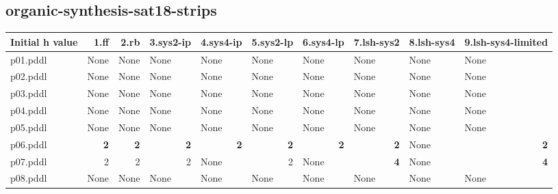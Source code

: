 \documentclass{article}
\begin{document}
\hypertarget{initial_h_value-organic-synthesis-sat18-strips}{}
\subsection*{organic-synthesis-sat18-strips}

\begin{tabular}{@{}lrrrrrrrrr@{}}
Initial h value & 1.ff & 2.rb & 3.sys2-ip & 4.sys4-ip & 5.sys2-lp & 6.sys4-lp & 7.lsh-sys2 & 8.lsh-sys4 & 9.lsh-sys4-limited \\
\midrule
p01.pddl & \multicolumn{1}{|l|}{None} & \multicolumn{1}{|l|}{None} & \multicolumn{1}{|l|}{None} & \multicolumn{1}{|l|}{None} & \multicolumn{1}{|l|}{None} & \multicolumn{1}{|l|}{None} & \multicolumn{1}{|l|}{None} & \multicolumn{1}{|l|}{None} & \multicolumn{1}{|l|}{None} \\
p02.pddl & \multicolumn{1}{|l|}{None} & \multicolumn{1}{|l|}{None} & \multicolumn{1}{|l|}{None} & \multicolumn{1}{|l|}{None} & \multicolumn{1}{|l|}{None} & \multicolumn{1}{|l|}{None} & \multicolumn{1}{|l|}{None} & \multicolumn{1}{|l|}{None} & \multicolumn{1}{|l|}{None} \\
p03.pddl & \multicolumn{1}{|l|}{None} & \multicolumn{1}{|l|}{None} & \multicolumn{1}{|l|}{None} & \multicolumn{1}{|l|}{None} & \multicolumn{1}{|l|}{None} & \multicolumn{1}{|l|}{None} & \multicolumn{1}{|l|}{None} & \multicolumn{1}{|l|}{None} & \multicolumn{1}{|l|}{None} \\
p04.pddl & \multicolumn{1}{|l|}{None} & \multicolumn{1}{|l|}{None} & \multicolumn{1}{|l|}{None} & \multicolumn{1}{|l|}{None} & \multicolumn{1}{|l|}{None} & \multicolumn{1}{|l|}{None} & \multicolumn{1}{|l|}{None} & \multicolumn{1}{|l|}{None} & \multicolumn{1}{|l|}{None} \\
p05.pddl & \multicolumn{1}{|l|}{None} & \multicolumn{1}{|l|}{None} & \multicolumn{1}{|l|}{None} & \multicolumn{1}{|l|}{None} & \multicolumn{1}{|l|}{None} & \multicolumn{1}{|l|}{None} & \multicolumn{1}{|l|}{None} & \multicolumn{1}{|l|}{None} & \multicolumn{1}{|l|}{None} \\
p06.pddl & \textbf{2} & \textbf{2} & \textbf{2} & \textbf{2} & \textbf{2} & \textbf{2} & \textbf{2} & \multicolumn{1}{|l|}{None} & \textbf{2} \\
p07.pddl & 2 & 2 & 2 & \multicolumn{1}{|l|}{None} & 2 & \multicolumn{1}{|l|}{None} & \textbf{4} & \multicolumn{1}{|l|}{None} & \textbf{4} \\
p08.pddl & \multicolumn{1}{|l|}{None} & \multicolumn{1}{|l|}{None} & \multicolumn{1}{|l|}{None} & \multicolumn{1}{|l|}{None} & \multicolumn{1}{|l|}{None} & \multicolumn{1}{|l|}{None} & \multicolumn{1}{|l|}{None} & \multicolumn{1}{|l|}{None} & \multicolumn{1}{|l|}{None} \\

\end{tabular}
\end{document}
